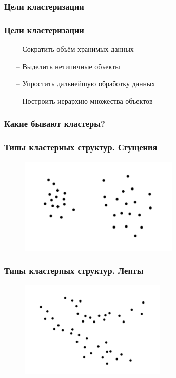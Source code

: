 \documentclass[12pt]{beamer}
\begin{document}
\begin{frame}\frametitle{Цели кластеризации}
\end{frame}

\begin{frame}\frametitle{Цели кластеризации}
	\begin{itemize}
		\item[--] Сократить объём хранимых данных
		\item[--] Выделить нетипичные объекты
		\item[--] Упростить дальнейшую обработку данных
		\item[--] Построить иерархию множества объектов				
	\end{itemize}
\end{frame}

\begin{frame}\frametitle{Какие бывают кластеры?}
\end{frame}

\begin{frame}\frametitle{Типы кластерных структур. Сгущения}
\begin{figure}[htbp]
  \includegraphics[height=130pt, keepaspectratio = true]{images/cluster1}  
\end{figure}
\end{frame}

\begin{frame}\frametitle{Типы кластерных структур. Ленты}
\begin{figure}[htbp]
  \includegraphics[height=130pt, keepaspectratio = true]{images/cluster2}  
\end{figure}
\end{frame}
\end{document}
